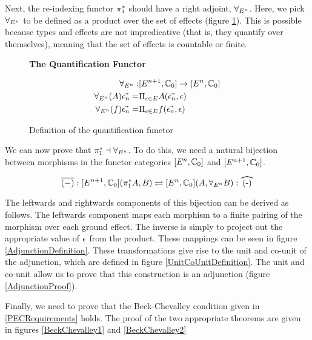 \documentclass{Report}
\begin{document}
Next, the re-indexing functor $\pi_1^*$ should have a right adjoint, $\forall_{E^n}$. Here, we pick $\forall_{E^n}$ to be defined as a product over the set of effects (figure \ref{ProductQuantification}). This is possible because types and effects are not impredicative (that is, they quantify over themselves), meaning that the set of effects is countable or finite.

\begin{figure}
    \begin{framed}
        \centering
        \textbf{The Quantification Functor}

        \begin{align}
            \forall_{E^n}:& [E^{n+1}, \mathbb{C}_0] \rightarrow [E^n, \mathbb{C}_0]\\
            \forall_{E^n}(A)\vec{\epsilon_n} =&\Pi_{\epsilon\in E}{A(\vec{\epsilon_n}, \epsilon)}
            \\ 
            \forall_{E^n}(f)\vec{\epsilon_n} =&\Pi_{\epsilon\in E}{f(\vec{\epsilon_n}, \epsilon)}
        \end{align}
        
    \end{framed}
    \caption{Definition of the quantification functor}
    \label{ProductQuantification}
\end{figure}



We can now prove that $\pi_1^* \dashv \forall_{E^n}$. To do this, we need a natural bijection between morphisms in the functor categories $[E^n, \mathbb{C}_0]$ and $[E^{n+1}, \mathbb{C}_0]$.

\begin{equation}
    \bar{(-)}: [E^{n+1}, \Cz](\pstar A, B) \rightleftharpoons [E^n,\Cz] (A, \allEn B): \widehat{(-)}
\end{equation}

The leftwards and rightwards components of this bijection can be derived as follows. The leftwards component maps each morphism to a finite pairing of the morphism over each ground effect. The inverse is simply to project out the appropriate value of $\epsilon$ from the product. These mappings can be seen in figure \ref{AdjunctionDefinition}. These transformations give rise to the unit and co-unit of the adjunction, which are defined in figure \ref{UnitCoUnitDefinition}. The unit and co-unit allow us to prove that this construction is an adjunction (figure \ref{AdjunctionProof}). 

Finally, we need to prove that the Beck-Chevalley condition given in \ref{PECRequirements} holds. The proof of the two appropriate theorems are given in figures \ref{BeckChevalley1} and \ref{BeckChevalley2}
\end{document}
